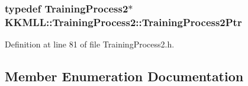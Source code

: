 \subsubsection[{\texorpdfstring{Training\+Process2\+Ptr}{TrainingProcess2Ptr}}]{\setlength{\rightskip}{0pt plus 5cm}typedef {\bf Training\+Process2}$\ast$ {\bf K\+K\+M\+L\+L\+::\+Training\+Process2\+::\+Training\+Process2\+Ptr}}\hypertarget{class_k_k_m_l_l_1_1_training_process2_a5442e76e1ae2de2e77e3a36b55f98fe4}{}\label{class_k_k_m_l_l_1_1_training_process2_a5442e76e1ae2de2e77e3a36b55f98fe4}


Definition at line 81 of file Training\+Process2.\+h.



\subsection{Member Enumeration Documentation}
